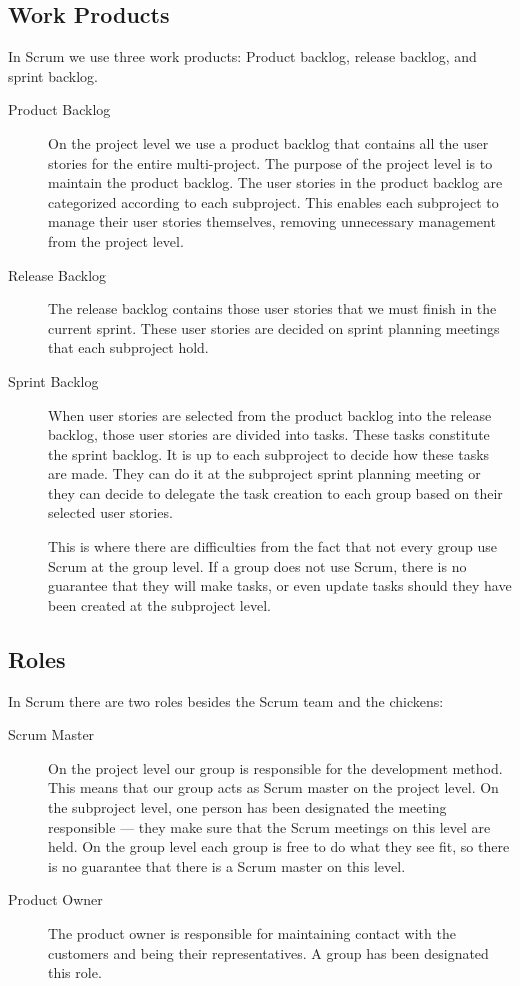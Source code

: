 
\subsection{Work Products}
In Scrum we use three work products: Product backlog, release backlog, and sprint backlog.

\begin{description}

\item[Product Backlog]
On the project level we use a product backlog that contains all the user stories for the entire multi-project. The purpose of the project level is to maintain the product backlog. The user stories in the product backlog are categorized according to each subproject. This enables each subproject to manage their user stories themselves, removing unnecessary management from the project level.

\item[Release Backlog]
The release backlog contains those user stories that we must finish in the current sprint. These user stories are decided on sprint planning meetings that each subproject hold.

\item[Sprint Backlog]
When user stories are selected from the product backlog into the release backlog, those user stories are divided into tasks. These tasks constitute the sprint backlog. It is up to each subproject to decide how these tasks are made. They can do it at the subproject sprint planning meeting or they can decide to delegate the task creation to each group based on their selected user stories.

This is where there are difficulties from the fact that not every group use Scrum at the group level. If a group does not use Scrum, there is no guarantee that they will make tasks, or even update tasks should they have been created at the subproject level.

\end{description}

\subsection{Roles}
In Scrum there are two roles besides the Scrum team and the chickens:

\begin{description}
  \item[Scrum Master] On the project level our group is responsible for the development method. This means that our group acts as Scrum master on the project level. On the subproject level, one person has been designated the meeting responsible --- they make sure that the Scrum meetings on this level are held. On the group level each group is free to do what they see fit, so there is no guarantee that there is a Scrum master on this level.
  \item[Product Owner] The product owner is responsible for maintaining contact with the customers and being their representatives. A group has been designated this role.
\end{description}

